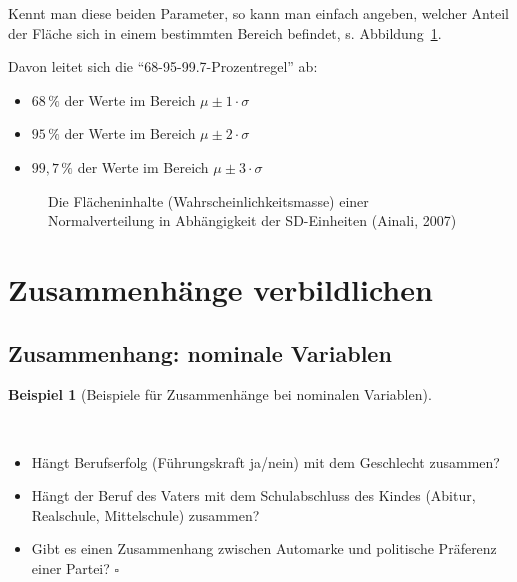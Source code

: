 \documentclass[
  letterpaper,
]{scrbook}
\providecommand{\tightlist}{%
  \setlength{\itemsep}{0pt}\setlength{\parskip}{0pt}}\usepackage{longtable,booktabs,array}
\theoremstyle{definition}
\newtheorem{example}{Beispiel}[chapter]
\theoremstyle{definition}
\theoremstyle{definition}
\theoremstyle{remark}
\begin{document}
Kennt man diese beiden Parameter, so kann man einfach angeben, welcher
Anteil der Fläche sich in einem bestimmten Bereich befindet, s.
Abbildung~\ref{fig-norm-perc}.

Davon leitet sich die ``68-95-99.7-Prozentregel'' ab:

\begin{itemize}
\tightlist
\item
  \(68\,\%\) der Werte im Bereich \(\mu\pm 1 \cdot \sigma\)
\item
  \(95\,\%\) der Werte im Bereich \(\mu\pm 2 \cdot \sigma\)
\item
  \(99{,}7\,\%\) der Werte im Bereich \(\mu\pm 3 \cdot \sigma\)
\end{itemize}

\begin{figure}


\caption{\label{fig-norm-perc}Die Flächeninhalte
(Wahrscheinlichkeitsmasse) einer Normalverteilung in Abhängigkeit der
SD-Einheiten (Ainali, 2007)}

\end{figure}%

\section{Zusammenhänge
verbildlichen}\label{zusammenhuxe4nge-verbildlichen}

\subsection{Zusammenhang: nominale
Variablen}\label{zusammenhang-nominale-variablen}

\begin{example}[Beispiele für Zusammenhänge bei nominalen
Variablen]\protect\hypertarget{exm-nom-zshg}{}\label{exm-nom-zshg}

~

\begin{itemize}
\tightlist
\item
  Hängt Berufserfolg (Führungskraft ja/nein) mit dem Geschlecht
  zusammen?
\item
  Hängt der Beruf des Vaters mit dem Schulabschluss des Kindes (Abitur,
  Realschule, Mittelschule) zusammen?
\item
  Gibt es einen Zusammenhang zwischen Automarke und politische Präferenz
  einer Partei? \(\square\)
\end{itemize}

\end{example}
\end{document}
